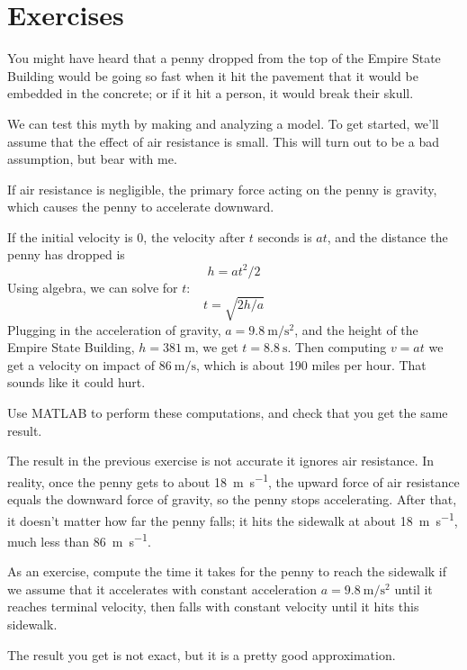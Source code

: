 \documentclass[
]{book}
\numberwithin{Answer}{chapter}
\numberwithin{Exercise}{chapter}
\begin{document}
\section{Exercises}

\newenvironment{ex}{\begin{Exercise}}{\end{Exercise}}

\begin{ex}
You might have heard that a penny dropped from the top of the Empire State Building would be going so fast when it hit the pavement that it would be embedded in the concrete; or if it hit a person, it would break their skull.


We can test this myth by making and analyzing a model.  To get started, we'll assume that the effect of air resistance is small.  This will turn out to be a bad assumption, but bear with me.

If air resistance is negligible, the primary force acting on the penny is gravity, which causes the penny to accelerate downward.

If the initial velocity is 0, the velocity after $t$ seconds is $a t$, and the distance the penny has dropped is
%
\[ h = a t^2 / 2 \]
%
Using algebra, we can solve for $t$:
%
\[ t = \sqrt{ 2 h / a} \]
%
Plugging in the acceleration of gravity, 
$a = \SI{9.8}{\meter\per\second\squared}$, and the height of the Empire State Building, 
$h = \SI{381}{\meter}$, we get 
$t = \SI{8.8}{\second}$.  
Then computing $v = a t$ we get a velocity on impact of $\SI{86}{\meter\per\second}$, which is about 190 miles per hour.  That sounds like it could hurt.

Use MATLAB to perform these computations, and check that you get the same result.
\end{ex}

\begin{ex}
The result in the previous exercise is not accurate it ignores air resistance.  In reality, once the penny gets to about \SI{18}{\meter\per\second}, the upward force of air resistance equals the downward force of gravity, so the penny stops accelerating.  After that, it doesn't matter how far the penny falls; it hits the sidewalk at about \SI{18}{\meter\per\second}, much less than \SI{86}{\meter\per\second}.

As an exercise, compute the time it takes for the penny to reach the sidewalk if we assume that it accelerates with constant acceleration
$a = \SI{9.8}{\meter\per\second\squared}$ until it reaches terminal velocity, then falls with constant velocity until it hits this sidewalk.

The result you get is not exact, but it is a pretty good approximation.

\end{ex}
\end{document}
